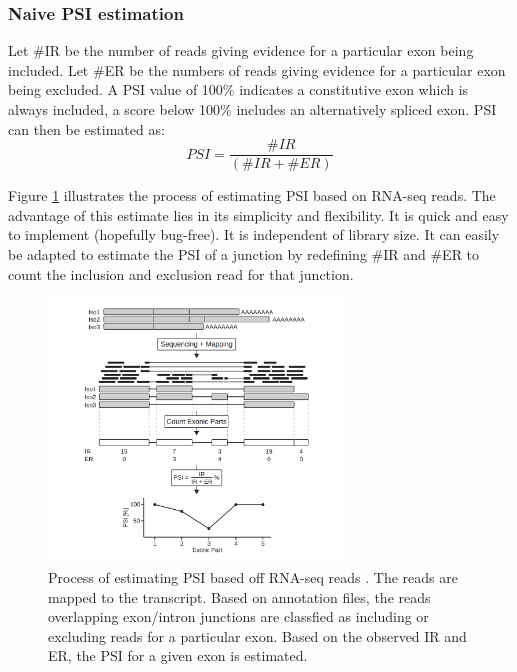 \subsubsection{Naive PSI estimation}\label{subsubsec:naivepsi}

Let \#IR be the number of reads giving evidence for a particular exon being included. Let \#ER be the numbers of reads giving evidence for a particular exon being excluded. A PSI value of 100\% indicates a constitutive exon which is always included, a score below 100\% includes an alternatively spliced exon. PSI can then be estimated as:
$$PSI = \frac{\#IR}{(\#IR+\#ER)}$$

Figure \ref{fig:psiestimation} illustrates the process of estimating PSI based on RNA-seq reads.  
The advantage of this estimate lies in its simplicity and flexibility. It is quick and easy to implement (hopefully bug-free). It is independent of library size. It can easily be adapted to estimate the PSI of a junction by redefining \#IR and \#ER to count the inclusion and exclusion read for that junction.

\begin{figure}
	\centering\includegraphics[width=0.7\textwidth]{../visualizations/ch4-methods/psi_estimation.png} 
	\caption{
		Process of estimating PSI based off RNA-seq reads \cite{berlinpsi}. The reads are mapped to the transcript. Based on annotation files, the reads overlapping exon/intron junctions are classfied as including or excluding reads for a particular exon. Based on the observed IR and ER, the PSI for a given exon is estimated.
		}
	\label{fig:psiestimation}
\end{figure}

